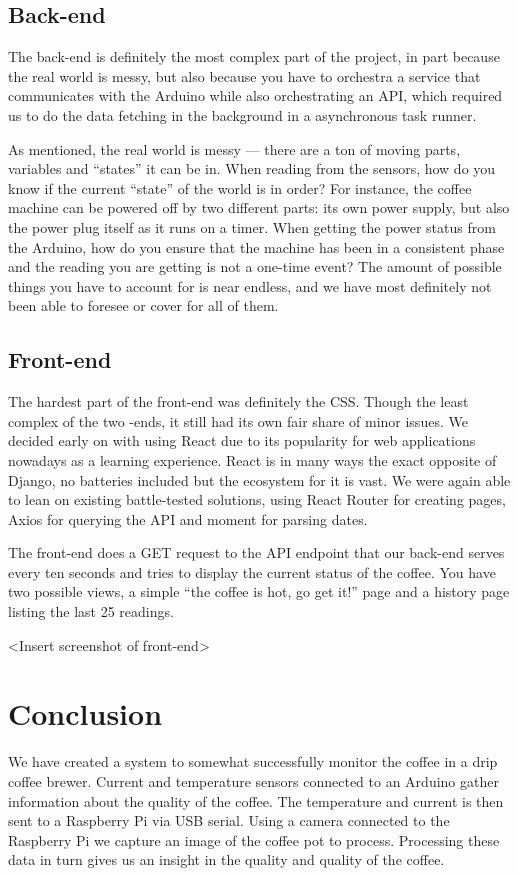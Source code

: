 \documentclass[12pt,a4paper,oneside,article]{memoir}
\numberwithin{equation}{chapter}
\begin{document}
\subsection{Back-end}\label{sec:back-end}
The back-end is definitely the most complex part of the project, in part because
the real world is messy, but also because you have to orchestra a service that
communicates with the Arduino while also orchestrating an API, which required 
us to do the data fetching in the background in a asynchronous task runner.

As mentioned, the real world is messy --- there are a ton of moving parts,
variables and ``states'' it can be in. When reading from the sensors, how do you
know if the current ``state'' of the world is in order? For instance, the coffee
machine can be powered off by two different parts: its own power supply, but
also the power plug itself as it runs on a timer. When getting the power status
from the Arduino, how do you ensure that the machine has been in a consistent
phase and the reading you are getting is not a one-time event? The amount of
possible things you have to account for is near endless, and we have most
definitely not been able to foresee or cover for all of them.

\subsection{Front-end}\label{sec:front-end}
The hardest part of the front-end was definitely the CSS. Though the least
complex of the two -ends, it still had its own fair share of minor issues. We
decided early on with using React due to its popularity for web applications
nowadays as a learning experience. React is in many ways the exact opposite of
Django, no batteries included but the ecosystem for it is vast. We were again
able to lean on existing battle-tested solutions, using React Router for
creating pages, Axios for querying the API and moment for parsing dates.

The front-end does a GET request to the API endpoint that our back-end serves
every ten seconds and tries to display the current status of the coffee. You
have two possible views, a simple ``the coffee is hot, go get it!'' page and a
history page listing the last 25 readings.

<Insert screenshot of front-end>

\section{Conclusion}\label{sec:conclusion}
We have created a system to somewhat successfully monitor the coffee in a
drip coffee brewer. %
Current and temperature sensors connected to an Arduino gather information about
the quality of the coffee. The temperature and current is then sent to a 
Raspberry Pi via USB serial. Using a camera connected to the Raspberry Pi we 
capture an image of the coffee pot to process. Processing these data in 
turn gives us an insight in the quality and quality of the coffee.
\end{document}
